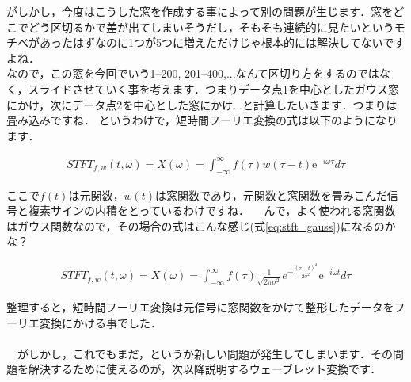 \documentclass[11pt,a4paper]{ujreport} 	%
\begin{document}
がしかし，今度はこうした窓を作成する事によって別の問題が生じます．窓をどこでどう区切るかで差が出てしまいそうだし，そもそも連続的に見たいというモチベがあったはずなのに1つが5つに増えただけじゃ根本的には解決してないですよね．\\

なので，この窓を今回でいう1--200, 201--400,...なんて区切り方をするのではなく，スライドさせていく事を考えます．つまりデータ点1を中心としたガウス窓にかけ，次にデータ点2を中心とした窓にかけ...と計算したいきます．つまりは畳み込みですね．
というわけで，短時間フーリエ変換の式は以下のようになります．

\begin{eqnarray}
STFT_{f,w}(t, \omega) =X(\omega)= \int_{-\infty}^{\infty} f(\tau)w(\tau - t)\mathrm{e}^{-i\omega \tau} d\tau
\label{eq:stft}
\end{eqnarray}

ここで$f(t)$は元関数，$w(t)$は窓関数であり，元関数と窓関数を畳みこんだ信号と複素サインの内積をとっているわけですね．
　んで，よく使われる窓関数はガウス関数なので，その場合の式はこんな感じ(式\ref{eq:stft_gauss})になるのかな？

\begin{eqnarray}
STFT_{f,w}(t, \omega) = X(\omega) = \int_{-\infty}^{\infty} f(\tau) \frac{1}{\sqrt{2\pi\sigma^2}}e^{-\frac{{(\tau-t)}^2}{2\sigma^2}}\mathrm{e}^{-i\omega t} d\tau
\label{eq:stft_gauss}
\end{eqnarray}

整理すると，短時間フーリエ変換は元信号に窓関数をかけて整形したデータをフーリエ変換にかける事でした．\\
\\
　がしかし，これでもまだ，というか新しい問題が発生してしまいます．その問題を解決するために使えるのが，次以降説明するウェーブレット変換です．
\end{document}
